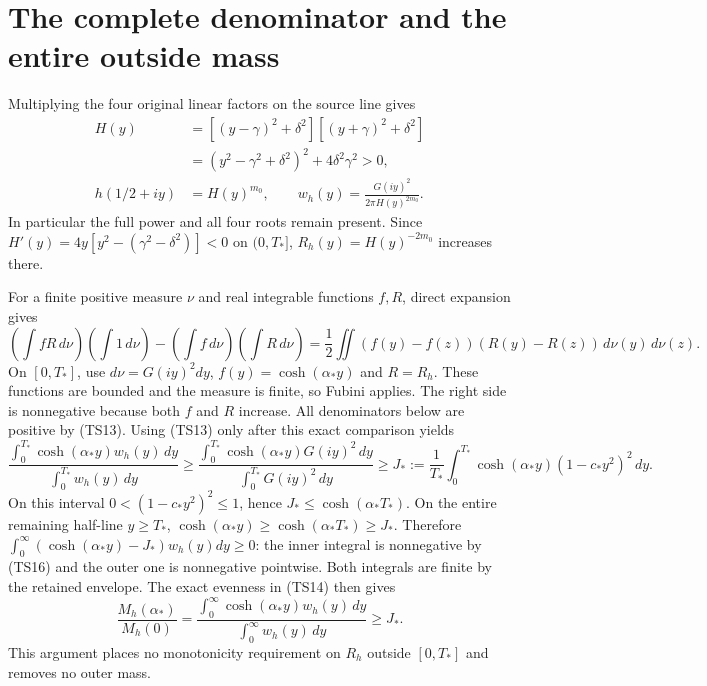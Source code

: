 \documentclass[11pt]{article}
\newcommand{\dd}{\,d}
\begin{document}
\section{The complete denominator and the entire outside mass}
Multiplying the four original linear factors on the source line gives
\begin{equation}\tag{TS14}\begin{aligned}
 H(y)&=[(y-\gamma)^2+\delta^2][(y+\gamma)^2+\delta^2]\\
 &=(y^2-\gamma^2+\delta^2)^2+4\delta^2\gamma^2>0,\\
 h(1/2+iy)&=H(y)^{m_0},\qquad
 w_h(y)=\frac{G(iy)^2}{2\pi H(y)^{2m_0}}.
\end{aligned}\end{equation}
In particular the full power and all four roots remain present.
Since $H'(y)=4y[y^2-(\gamma^2-\delta^2)]<0$ on $(0,T_*]$,
$R_h(y)=H(y)^{-2m_0}$ increases there.

For a finite positive measure $\nu$ and real integrable functions
$f,R$, direct expansion gives
\begin{equation}\tag{TS15}
 \left(\int fR\dd\nu\right)\left(\int1\dd\nu\right)
 -\left(\int f\dd\nu\right)\left(\int R\dd\nu\right)
 =\frac12\iint(f(y)-f(z))(R(y)-R(z))\dd\nu(y)\dd\nu(z).
\end{equation}
On $[0,T_*]$, use $d\nu=G(iy)^2dy$, $f(y)=\cosh(\alpha_*y)$
and $R=R_h$. These functions are bounded and the measure is finite,
so Fubini applies. The right side is nonnegative because both
$f$ and $R$ increase. All denominators below are positive by (TS13).
Using (TS13) only after this exact comparison yields
\begin{equation}\tag{TS16}
 \frac{\int_0^{T_*}\cosh(\alpha_*y)w_h(y)\dd y}
      {\int_0^{T_*}w_h(y)\dd y}
 \geq\frac{\int_0^{T_*}\cosh(\alpha_*y)G(iy)^2\dd y}
              {\int_0^{T_*}G(iy)^2\dd y}
 \geq J_*:=\frac1{T_*}\int_0^{T_*}\cosh(\alpha_*y)(1-c_*y^2)^2\dd y.
\end{equation}
On this interval $0<(1-c_*y^2)^2\leq1$, hence
$J_*\leq\cosh(\alpha_*T_*)$. On the entire remaining half-line
$y\geq T_*$, $\cosh(\alpha_*y)\geq\cosh(\alpha_*T_*)\geq J_*$.
Therefore
$\int_0^\infty(\cosh(\alpha_*y)-J_*)w_h(y)dy\geq0$:
the inner integral is nonnegative by (TS16) and the outer one
is nonnegative pointwise. Both integrals are finite by the retained
envelope. The exact evenness in (TS14) then gives
\begin{equation}\tag{TS17}
 \frac{M_h(\alpha_*)}{M_h(0)}
 =\frac{\int_0^\infty\cosh(\alpha_*y)w_h(y)\dd y}
        {\int_0^\infty w_h(y)\dd y}\geq J_*.
\end{equation}
This argument places no monotonicity requirement on $R_h$ outside
$[0,T_*]$ and removes no outer mass.
\end{document}
